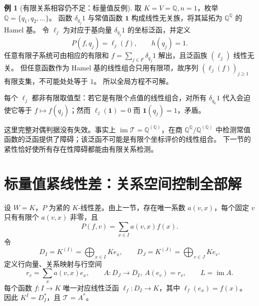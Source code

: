 \documentclass[UTF8,11pt,a4paper]{ctexart}
\theoremstyle{definition}
\newtheorem{example}[theorem]{例}
\newcommand{\Q}{\mathbb Q}
\newcommand{\im}{\operatorname{im}}
\newcommand{\T}{\mathcal T}
\numberwithin{equation}{section}
\begin{document}
\begin{example}[有限关系相容仍不足：标量值反例]\label{ex:noncompact}
取 $K=V=\Q,n=1$，枚举 $\Q=\{q_1,q_2,\ldots\}$。
函数 $\delta_{q_j}1$ 与常值函数 $\mathbf1$ 构成线性无关族，将其延拓为 $\Q^{\Q}$ 的 Hamel 基。
令 $\ell_j$ 为对应于基向量 $\delta_{q_j}1$ 的坐标泛函，并定义
\[
 P(f,q_j)=\ell_j(f),\qquad h(q_j)=1.
\]
任意有限子系统可由相应的有限和 $f=\sum_{j\in F}\delta_{q_j}1$ 解出，且泛函族 $(\ell_j)$ 线性无关。
但任意函数作为 Hamel 基的线性组合只用有限项，故序列 $(\ell_j(f))_{j\ge1}$ 有限支集，不可能处处等于 $1$。
所以全局方程不可解。

每个 $\ell_j$ 都非有限取值型：若它是有限个点值的线性组合，对所有 $\delta_{q_k}1$ 代入会迫使它等于 $f\mapsto f(q_j)$；然而 $\ell_j(\mathbf1)=0$ 而 $\mathbf1(q_j)=1$，矛盾。
\end{example}
这里完整对偶判据没有失效。事实上 $\im\T=\Q^{(\Q)}$，在商 $\Q^{\Q}/\Q^{(\Q)}$ 中检测常值函数的泛函提供了障碍；该泛函不可能是有限个坐标评价的线性组合。
下一节的紧性恰好使所有存在性障碍都能由有限关系检测。

\section{标量值紧线性差：关系空间控制全部解}\label{sec:scalar}
设 $W=K$，$P$ 为紧的 $K$-线性差。由上一节，存在唯一系数 $a(v,x)$，每个固定 $v$ 只有有限个 $a(v,x)$ 非零，且
\begin{equation}\label{eq:rowfinite}
 P(f,v)=\sum_{x\in I}a(v,x)f(x).
\end{equation}
令
\[
 D_I=K^{(I)}=\bigoplus_{x\in I}Ke_x,\qquad
 D_J=K^{(J)}=\bigoplus_{v\in J}Ke_v.
\]
定义行向量、关系映射与行空间
\begin{equation}\label{eq:A}
 r_v=\sum_xa(v,x)e_x,\qquad
 A:D_J\to D_I,\ A(e_v)=r_v,\qquad L=\im A.
\end{equation}
每个函数 $f:I\to K$ 唯一对应线性泛函
$\ell_f:D_I\to K$，其中 $\ell_f(e_x)=f(x)$。
因此 $K^I=D_I^*$，且 $\T=A^*$。
\end{document}
